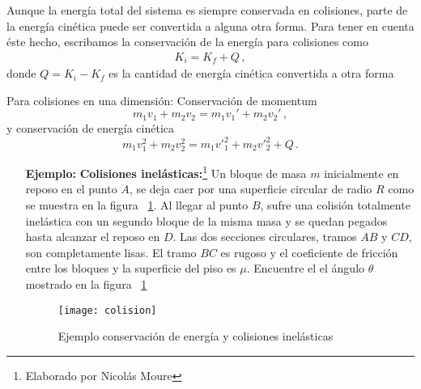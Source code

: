 Aunque la energía total del sistema es siempre conservada en colisiones, parte de la energía cinética puede ser convertida a alguna otra forma. Para tener en cuenta éste hecho, escribamos la conservación de la energía para colisiones como
\begin{align}
\label{eq:calor}
  K_i=K_f+Q\,,
\end{align}
donde $Q=K_i-K_f$ es la cantidad de energía cinética convertida a otra forma

Para colisiones en una dimensión:
Conservaci\'on de momentum
\begin{equation}\label{eq:E1}
  m_1 v_1 + m_2 v_2 = m_1 v_1' + m_2 v_2'\,,
\end{equation}
y conservaci\'on de energía cinética
\begin{equation}\label{eq:E2}
  m_1 v^2_1 + m_2 v^2_2 = m_1 {v'}^2_1 + m_2 {v'}^2_2+Q\,.
\end{equation}

\begin{frame}
  \begin{itemize}
\item[\textbf{Ejemplo:}] \textbf{Colisiones
    inelásticas:}\footnote{Elaborado por Nicolás Moure} Un bloque de masa $m$ inicialmente en reposo
  en el punto $A$, se deja caer por una superficie circular de radio
  $R$ como se muestra en la figura ~\ref{fig:colision}. Al llegar al
  punto $B$, sufre una colisión totalmente inelástica con un segundo
  bloque de la misma masa y se quedan pegados hasta alcanzar el reposo
  en $D$. Las dos secciones circulares, tramos $AB$ y $CD$, son
  completamente lisas. El tramo $BC$ es rugoso y el coeficiente de
  fricción entre los bloques y la superficie del piso es
  $\mu$. Encuentre el  el ángulo $\theta$ mostrado en la figura ~\ref{fig:colision}

  \begin{figure}
    \centering
    \texttt{[image: colision]}
    \caption{Ejemplo conservación de energía y colisiones inelásticas}
    \label{fig:colision}
  \end{figure}

\end{itemize}

\end{frame}


